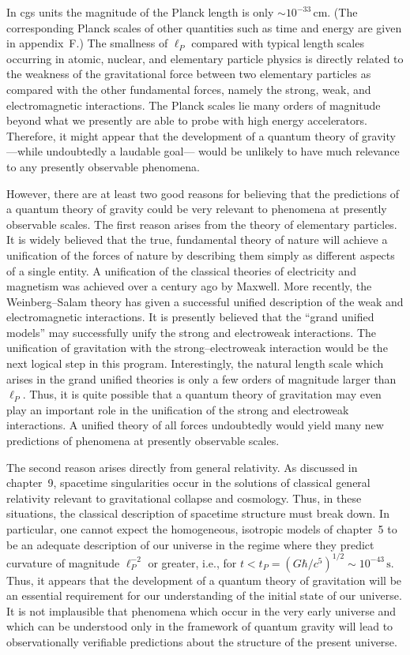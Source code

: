 In cgs units the magnitude of the Planck length is only \(\sim10^{-33}\,\mathrm{cm}\).
(The corresponding Planck scales of other quantities such as time and energy are given in
appendix~F.) The smallness of \(\ell_P\) compared with typical length scales occurring in
atomic, nuclear, and elementary particle physics is directly related to the weakness
of the gravitational force between two elementary particles as compared with the
other fundamental forces, namely the strong, weak, and electromagnetic interactions.
The Planck scales lie many orders of magnitude beyond what we presently
are able to probe with high energy accelerators. Therefore, it might appear that the
development of a quantum theory of gravity---while undoubtedly a laudable goal---
would be unlikely to have much relevance to any presently observable phenomena.

However, there are at least two good reasons for believing that the predictions of
a quantum theory of gravity could be very relevant to phenomena at presently
observable scales. The first reason arises from the theory of elementary particles. It
is widely believed that the true, fundamental theory of nature will achieve a
unification of the forces of nature by describing them simply as different aspects of
a single entity. A unification of the classical theories of electricity and magnetism
was achieved over a century ago by Maxwell. More recently, the Weinberg--Salam
theory has given a successful unified description of the weak and electromagnetic
interactions. It is presently believed that the ``grand unified models'' may successfully
unify the strong and electroweak interactions. The unification of gravitation with the
strong--electroweak interaction would be the next logical step in this program. Interestingly,
the natural length scale which arises in the grand unified theories is only a
few orders of magnitude larger than \(\ell_P\). Thus, it is quite possible that a quantum
theory of gravitation may even play an important role in the unification of the strong
and electroweak interactions. A unified theory of all forces undoubtedly would yield
many new predictions of phenomena at presently observable scales.

The second reason arises directly from general relativity. As discussed in chapter~9,
spacetime singularities occur in the solutions of classical general relativity relevant
to gravitational collapse and cosmology. Thus, in these situations, the classical
description of spacetime structure must break down. In particular, one cannot expect
the homogeneous, isotropic models of chapter~5 to be an adequate description of our
universe in the regime where they predict curvature of magnitude \(\ell_P^{-2}\) or greater,
i.e., for
\(t<t_P=(G\hbar/c^5)^{1/2}\sim10^{-43}\,\mathrm{s}\). Thus, it appears that the
development of a quantum theory of gravitation will be an essential requirement for
our understanding of the initial state of our universe. It is not implausible that phenomena
which occur in the very early universe and which can be understood only in the framework of
quantum gravity will lead to observationally verifiable predictions about the structure
of the present universe.

